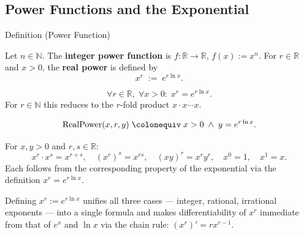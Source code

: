 
\subsection*{Power Functions and the Exponential}
\label{sec:power-exponential}


\begin{definitionbox}{Definition (Power Function)}
\begin{definition}
\label{def:power-function}
Let $n \in \mathbb{N}$. The \textbf{integer power function} is
$f : \mathbb{R} \to \mathbb{R}$, $f(x) := x^n$. For $r \in \mathbb{R}$
and $x > 0$, the \textbf{real power} is defined by
\[
  x^r \;:=\; e^{r \ln x}.
\]
\end{definition}
\end{definitionbox}\begin{remark*}
\[
  \forall r \in \mathbb{R},\; \forall x > 0 :\; x^r = e^{r\ln x}.
\]
For $r \in \mathbb{N}$ this reduces to the $r$-fold product
$x \cdot x \cdots x$.
\end{remark*}

\begin{remark*}
\[
  \operatorname{RealPower}(x, r, y)
  \;\colonequiv\;
  x > 0 \;\wedge\; y = e^{r \ln x}.
\]
\end{remark*}

\begin{remark*}
For $x, y > 0$ and $r, s \in \mathbb{R}$:
\[
  x^r \cdot x^s = x^{r+s}, \quad
  (x^r)^s = x^{rs}, \quad
  (xy)^r = x^r y^r, \quad
  x^0 = 1, \quad
  x^1 = x.
\]
Each follows from the corresponding property of the exponential via
the definition $x^r = e^{r\ln x}$.
\end{remark*}

\begin{remark*}[Interpretation]
Defining $x^r := e^{r\ln x}$ unifies all three cases --- integer,
rational, irrational exponents --- into a single formula and makes
differentiability of $x^r$ immediate from that of $e^x$ and $\ln x$
via the chain rule: $(x^r)' = rx^{r-1}$.
\end{remark*}

